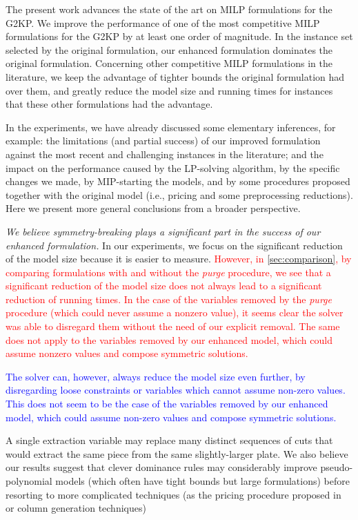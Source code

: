 \documentclass[smallextended]{svjour3}       %
\newif\iffinalversion
\newcommand{\newtext}[1]{\iffinalversion%
#1%
\else%
\textcolor{blue}{#1}%
\fi%
}
\newcommand{\oldtext}[1]{\iffinalversion%
#1%
\else%
\textcolor{red}{#1}%
\fi%
}
\begin{document}
The present work advances the state of the art on MILP formulations for the G2KP.
We improve the performance of one of the most competitive MILP formulations for the G2KP by at least one order of magnitude.
In the instance set selected by the original formulation, our enhanced formulation dominates the original formulation.
Concerning other competitive MILP formulations in the literature, we keep the advantage of tighter bounds the original formulation had over them, and greatly reduce the model size and running times for instances that these other formulations had the advantage.

In the experiments, we have already discussed some elementary inferences, for example: the limitations (and partial success) of our improved formulation against the most recent and challenging instances in the literature; and the impact on the performance caused by the LP-solving algorithm, by the specific changes we made, by MIP-starting the models, and by some procedures proposed together with the original model (i.e., pricing and some preprocessing reductions).
Here we present more general conclusions from a broader perspective.

\emph{We believe symmetry-breaking plays a significant part in the success of our enhanced formulation.}
In our experiments, we focus on the significant reduction of the model size because it is easier to measure. \oldtext{However, in \autoref{sec:comparison}, by comparing formulations with and without the \emph{purge} procedure, we see that a significant reduction of the model size does not always lead to a significant reduction of running times. In the case of the variables removed by the \emph{purge} procedure (which could never assume a nonzero value), it seems clear the solver was able to disregard them without the need of our explicit removal. The same does not apply to the variables removed by our enhanced model, which could assume nonzero values and compose symmetric solutions.}
\newtext{The solver can, however, always reduce the model size even further, by disregarding loose constraints or variables which cannot assume non-zero values. This does not seem to be the case of the variables removed by our enhanced model, which could assume non-zero values and compose symmetric solutions.}
A single extraction variable may replace many distinct sequences of cuts that would extract the same piece from the same slightly-larger plate.
We also believe our results suggest that clever dominance rules may considerably improve pseudo-polynomial models (which often have tight bounds but large formulations) before resorting to more complicated techniques (as the pricing procedure proposed in~\cite{furini:2016} or column generation techniques)
\end{document}
